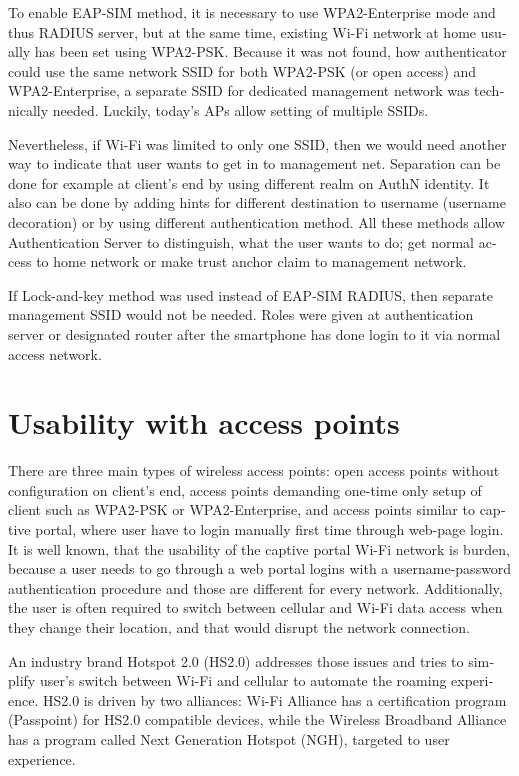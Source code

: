 \documentclass[12pt,a4paper,english]{tutthesis}
\begin{document}
\begin{otherlanguage}{english}
To enable EAP-SIM method, it is necessary to use WPA2-Enterprise mode
and thus RADIUS server, but at the same time, existing Wi-Fi network at
home usually has been set using WPA2-PSK.
Because it was not found, how authenticator could use the same network
SSID for both WPA2-PSK (or open access) and WPA2-Enterprise, a
separate SSID for dedicated management network was technically needed.
Luckily, today's APs allow setting of multiple SSIDs.

Nevertheless, if Wi-Fi was limited to only one SSID, then we would
need another 
way to indicate that user wants to get in to management net. 
Separation can be done for example at client's  end by using different realm on
AuthN identity. It also can be done by adding hints for different destination to
username (username decoration) or by using different authentication
method. All these methods allow Authentication Server to distinguish, what the user
wants to do; get normal access to home network or make trust anchor claim to 
management network.

If Lock-and-key method was used instead of EAP-SIM RADIUS, then
separate manage\-ment SSID would not be needed. Roles were given at
authentication server or designated router after the smartphone has done login to it
via normal access network.


\section{Usability with access points}
\label{sec-6-4}
There are three main types of wireless access points: open access
points without configuration on client's end, access points 
demanding one-time only setup of client such as WPA2-PSK or
WPA2-Enterprise, and access points similar to captive portal, where
user have to login manually first time through web-page login.
It is well known, that the usability of the captive portal Wi-Fi
 network is burden, because a user needs to go through 
a web portal logins with a username-password authentication 
procedure and those are different for every network.
Additionally, the user is often required to switch 
between cellular and  Wi-Fi data access when they change their
 location, and that would disrupt the network connection.

An industry brand  Hotspot 2.0 (HS2.0) addresses those issues and tries to
simplify user's switch between Wi-Fi and cellular to automate the
roaming experience.  HS2.0 is driven by two alliances:
Wi-Fi Alliance has a certification program (Passpoint)
for HS2.0 compatible devices, while the Wireless Broadband
Alliance has a program called Next Generation Hotspot (NGH), targeted
to user experience\cite{wba-ngh}.


\end{otherlanguage}
\end{document}
